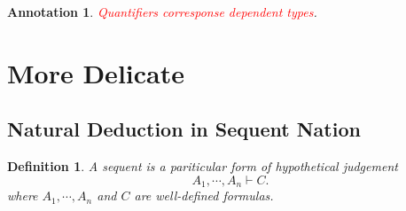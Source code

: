 \documentclass{article}
\theoremstyle{plain}
\newtheorem{definition}[theorem]{Definition}
\newtheorem{annotation}[theorem]{Annotation}
\theoremstyle{nonumberplain}
\newcommand{\redt}[1]{\textcolor{red}{#1}}
\begin{document}
\begin{annotation}
\rm \redt{Quantifiers corresponse dependent types}.
\end{annotation}

\newpage
\section{More Delicate}

\subsection{Natural Deduction in Sequent Nation}

\begin{definition}
\rm A sequent is a pariticular form of hypothetical judgement
$$
A_1, \cdots, A_n \vdash C.
$$
where $A_1,\cdots,A_n$ and $C$ are well-defined formulas.
\end{definition}
\end{document}
